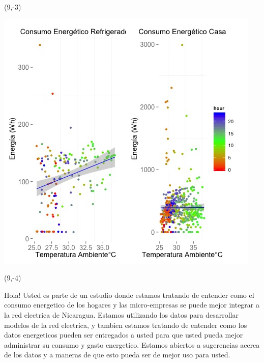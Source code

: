\documentclass{article}\usepackage[]{graphicx}\usepackage[]{color}
\newenvironment{knitrout}{}{} %
\begin{document}
 \begin{textblock}{1}(9,-3)
\begin{minipage}{20em}
\begingroup

\endgroup
\end{minipage}
\end{textblock}


\begin{knitrout}
\color{fgcolor}
\includegraphics[scale=0.75]{figure/A1_correlaciones} 
\end{knitrout}

 \begin{textblock}{1}(9,-4)
\begin{minipage}{20em}
\begingroup

\endgroup
\end{minipage}
\end{textblock}


\vspace{70px}
\begin{knitrout}
Hola! Usted es parte de un estudio donde estamos tratando de entender como el consumo energetico de los hogares y las micro-empresas se puede mejor integrar a la red electrica de Nicaragua. Estamos utilizando los datos para desarrollar modelos de la red electrica, y tambien estamos tratando de entender como los datos energeticos pueden ser entregados a usted para que usted pueda mejor administrar su consumo y gasto energetico.  Estamos abiertos a sugerencias acerca de los datos y a maneras de que esto pueda ser de mejor uso para usted.
\end{knitrout}
\end{document}
